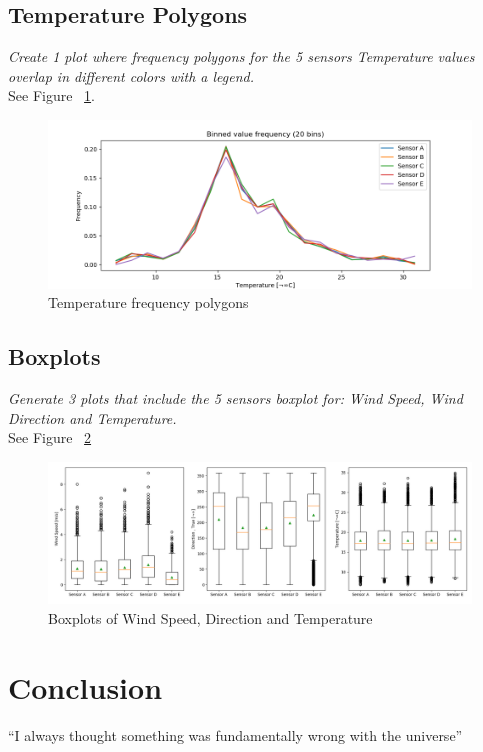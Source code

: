 \documentclass{article}
\begin{document}
\newpage

\subsection{Temperature Polygons}
\textit{
Create 1 plot where frequency polygons for the 5 sensors Temperature values overlap in different colors with a legend.
}\\

See Figure ~\ref{fig:1-3}.

\begin{figure}[!htb]
\centering
\includegraphics[width=\textwidth]{1-3-freq.png}
\caption{Temperature frequency polygons}
\label{fig:1-3}
\end{figure}

\subsection{Boxplots}
\textit{
Generate 3 plots that include the 5 sensors boxplot for: Wind Speed, Wind Direction and Temperature.
}\\

See Figure ~\ref{fig:1-4}

\begin{figure}[!htb]
\centering
\includegraphics[width=\textwidth]{1-4-box.png}
\caption{Boxplots of Wind Speed, Direction and Temperature}
\label{fig:1-4}
\end{figure}


\section{Conclusion}
``I always thought something was fundamentally wrong with the universe''
\end{document}
